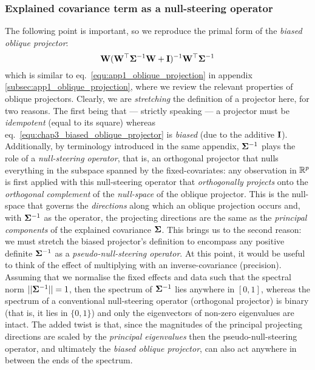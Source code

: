       \subsubsection{Explained covariance term as a null-steering operator} \label{subsubsec:chap3_null_steering_operator}
	The following point is important, so we reproduce the primal form of the \textit{biased oblique projector}:
	\begin{equation} \label{equ:chap3_biased_oblique_projector}
	  \mathbf{W} (\mathbf{W}^\top \mathbf{\Sigma}^{-1} \mathbf{W} + \mathbf{I})^{-1} \mathbf{W}^\top \mathbf{\Sigma}^{-1}
	\end{equation}
	which is similar to eq.~\eqref{equ:app1_oblique_projection} in appendix \ref{subsec:app1_oblique_projection}, where we review the relevant properties of oblique projectors. Clearly, we are \emph{stretching} the definition of a projector here, for two reasons. The first being that --- strictly speaking --- a projector must be \emph{idempotent} (equal to its square) whereas eq.~\eqref{equ:chap3_biased_oblique_projector} is \textit{biased} (due to the additive $\mathbf{I}$). Additionally, by terminology introduced in the same appendix, $\mathbf{\Sigma}^{-1}$ plays the role of a \emph{null-steering operator}, that is, an orthogonal projector that nulls everything in the subspace spanned by the fixed-covariates: any observation in $\mathbb{R}^{p}$ is first applied with this null-steering operator that \emph{orthogonally projects} onto the \textit{orthogonal complement} of the \textit{null-space} of the oblique projector. This is the null-space that governs the \emph{directions} along which an oblique projection occurs and, 
with $\mathbf{\Sigma}^{-1}$ as the operator, the projecting directions are the same as the \emph{principal components} of the explained covariance $\mathbf{\Sigma}$. This brings us to the second reason: we must stretch the biased projector's definition to encompass any positive definite $\mathbf{\Sigma}^{-1}$ as a \textit{pseudo-null-steering operator}. At this point, it would be useful to think of the effect of multiplying with an inverse-covariance (precision). Assuming that we normalise the fixed effects and data such that the spectral norm $\vert\vert \mathbf{\Sigma}^{-1} \vert\vert = 1$, then the spectrum of $\mathbf{\Sigma}^{-1}$ lies anywhere in $[0,1]$, whereas the spectrum of a conventional null-steering operator (orthogonal projector) is binary (that is, it lies in $\{0,1\}$) and only the eigenvectors of non-zero eigenvalues are intact. The added twist is that, since the magnitudes of the principal projecting directions are scaled by the \textit{principal eigenvalues} then the pseudo-null-steering operator, and ultimately the \textit{biased oblique 
projector}, can also act anywhere in between the ends of the spectrum.

